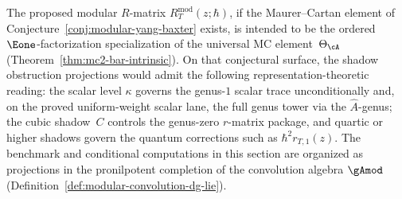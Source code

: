 The proposed modular $R$-matrix $R_T^{\mathrm{mod}}(z;\hbar)$, if the
Maurer--Cartan element of
Conjecture~\ref{conj:modular-yang-baxter} exists, is intended to be
the ordered $\Eone$-factorization specialization of the universal MC
element~$\Theta_\cA$ (Theorem~\ref{thm:mc2-bar-intrinsic}). On that
conjectural surface, the shadow obstruction projections would admit the
 following representation-theoretic reading: the scalar level
 $\kappa$ governs the genus-$1$ scalar trace unconditionally and, on
 the proved uniform-weight scalar lane, the full genus tower via the
 $\hat{A}$-genus; the cubic
 shadow~$C$ controls the genus-zero $r$-matrix package, and quartic or
higher shadows govern the quantum corrections such as
$\hbar^2 r_{T,1}(z)$. The benchmark and conditional computations in
this section are organized as projections in the pronilpotent
completion of the convolution algebra $\gAmod$
(Definition~\ref{def:modular-convolution-dg-lie}).

\providecommand{\ModEnv}{\operatorname{ModEnv}}
\providecommand{\Ymod}{Y^{\mathrm{mod}}}

